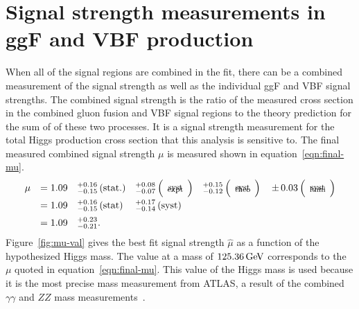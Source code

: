 \section{Signal strength measurements in ggF and VBF production}

When all of the signal regions are combined in the fit, there can be a combined measurement of the signal strength as well as the individual ggF and VBF signal strengths. The combined signal strength is the ratio of the measured cross section in the combined gluon fusion and VBF signal regions to the theory prediction for the sum of of these two processes. It is a signal strength measurement for the total Higgs production cross section that this analysis is sensitive to. The final measured combined signal strength $\mu$ is measured shown in equation~\ref{eqn:final-mu}.
%
\begin{equation}
\begin{array}{llllll}
 \mu
 &= 1.09%
 &^{+0.16}_{-0.15}\,(\textrm{stat.})%
 &^{+0.08}_{-0.07}\,\Big(\!\begin{tabular}{c}{\rm\footnotesize expt}\\ \noalign{\vskip -0.50truecm}{\rm\footnotesize syst}\end{tabular}\!\Big)%
 &^{+0.15}_{-0.12}\,\Big(\!\begin{tabular}{c}{\rm\footnotesize theo}\\ \noalign{\vskip -0.50truecm}{\rm\footnotesize syst}\end{tabular}\!\Big)%
 &{\PM}0.03\,\Big(\!\begin{tabular}{c}{\rm\footnotesize lumi}\\ \noalign{\vskip -0.50truecm}{\rm\footnotesize syst}\end{tabular}\!\Big)%
 \\
 \clineskip
 &= 1.09 &^{+0.16}_{-0.15}\,\textrm{(stat)} &^{+0.17}_{-0.14}\,\textrm{(syst)}
 \\
 \clineskip
 \clineskip
 &= 1.09 &^{+0.23}_{-0.21}.
\end{array}
\label{eqn:final-mu}
\end{equation}
%
Figure~\ref{fig:mu-val} gives the best fit signal strength $\hat{\mu}$ as a function of the hypothesized Higgs mass. The value at a mass of $125.36 \GeV$ corresponds to the $\mu$ quoted in equation~\ref{eqn:final-mu}. This value of the Higgs mass is used because it is the most precise mass measurement from ATLAS, a result of the combined $\gamma\gamma$ and $ZZ$ mass measurements~\cite{HiggsMass}.

